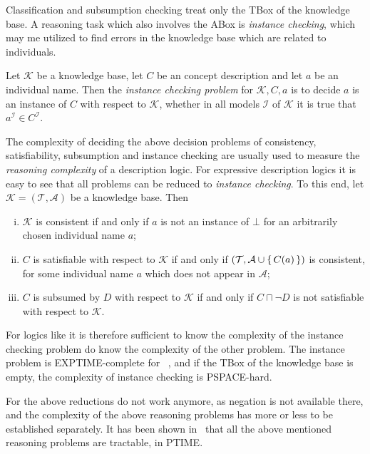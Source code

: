 Classification and subsumption checking treat only the TBox of the knowledge base.  A
reasoning task which also involves the ABox is \emph{instance checking}, which may me
utilized to find errors in the knowledge base which are related to individuals.

\begin{Definition}
  \label{def:instance-checking}
  Let $\mathcal{K}$ be a knowledge base, let $C$ be an \ELbot concept description and let
  $a$ be an individual name.  Then the \emph{instance checking problem} for $\mathcal{K},
  C, a$ is to decide $a$ is an instance of $C$ with respect to $\mathcal{K}$, \ie whether
  in all models $\mathcal{I}$ of $\mathcal{K}$ it is true that $a^{\mathcal{I}} \in
  C^{\mathcal{I}}$.
\end{Definition}

The complexity of deciding the above decision problems of consistency, satisfiability,
subsumption and instance checking are usually used to measure the \emph{reasoning
  complexity} of a description logic.  For expressive description logics it is easy to see
that all problems can be reduced to \emph{instance checking}.  To this end, let
$\mathcal{K} = (\mathcal{T}, \mathcal{A})$ be a knowledge base.  Then
\begin{enumerate}[i. ]
\item $\mathcal{K}$ is consistent if and only if $a$ is not an instance of $\bot$ for an
  arbitrarily chosen individual name $a$;
\item $C$ is satisfiable with respect to $\mathcal{K}$ if and only if $(\mathcal{T},
  \mathcal{A} \cup {\ensuremath{\{\, C(a) \,\}}} )$ is consistent, for some individual name $a$ which does
  not appear in $\mathcal{A}$;
\item $C$ is subsumed by $D$ with respect to $\mathcal{K}$ if and only if $C \sqcap \neg
  D$ is not satisfiable with respect to $\mathcal{K}$.
\end{enumerate}
For logics like \ALC it is therefore sufficient to know the complexity of the instance
checking problem do know the complexity of the other problem.  The instance problem is
EXPTIME-complete for \ALC~\cite{DLhandbook}, and if the TBox of the knowledge base is
empty, the complexity of instance checking is PSPACE-hard.

For \ELbot the above reductions do not work anymore, as negation is not available there,
and the complexity of the above reasoning problems has more or less to be established
separately.  It has been shown in~\cite{DBLP:conf/ijcai/Baader03a,
  DBLP:conf/ecai/Brandt04, DBLP:conf/ijcai/BaaderBL05} that all the above mentioned
reasoning problems are tractable, \ie in PTIME.

